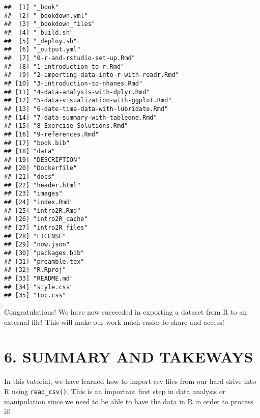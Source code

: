 \documentclass[
]{book}
\begin{document}
\begin{verbatim}
##  [1] "_book"                                 
##  [2] "_bookdown.yml"                         
##  [3] "_bookdown_files"                       
##  [4] "_build.sh"                             
##  [5] "_deploy.sh"                            
##  [6] "_output.yml"                           
##  [7] "0-r-and-rstudio-set-up.Rmd"            
##  [8] "1-introduction-to-r.Rmd"               
##  [9] "2-importing-data-into-r-with-readr.Rmd"
## [10] "3-introduction-to-nhanes.Rmd"          
## [11] "4-data-analysis-with-dplyr.Rmd"        
## [12] "5-data-visualization-with-ggplot.Rmd"  
## [13] "6-date-time-data-with-lubridate.Rmd"   
## [14] "7-data-summary-with-tableone.Rmd"      
## [15] "8-Exercise-Solutions.Rmd"              
## [16] "9-references.Rmd"                      
## [17] "book.bib"                              
## [18] "data"                                  
## [19] "DESCRIPTION"                           
## [20] "Dockerfile"                            
## [21] "docs"                                  
## [22] "header.html"                           
## [23] "images"                                
## [24] "index.Rmd"                             
## [25] "intro2R.Rmd"                           
## [26] "intro2R_cache"                         
## [27] "intro2R_files"                         
## [28] "LICENSE"                               
## [29] "now.json"                              
## [30] "packages.bib"                          
## [31] "preamble.tex"                          
## [32] "R.Rproj"                               
## [33] "README.md"                             
## [34] "style.css"                             
## [35] "toc.css"
\end{verbatim}

Congratulations! We have now succeeded in exporting a dataset from R to an external file! This will make our work much easier to share and access!

\hypertarget{summary-and-takeways-1}{%
\section{6. SUMMARY AND TAKEWAYS}\label{summary-and-takeways-1}}

In this tutorial, we have learned how to import csv files from our hard drive into R using \texttt{read\_csv()}. This is an important first step in data analysis or manipulation since we need to be able to have the data in R in order to process it!
\end{document}
